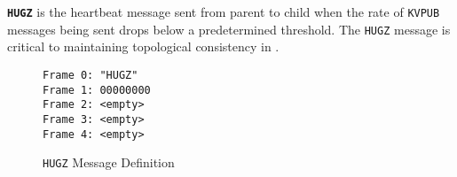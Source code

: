 \textbf{\texttt{HUGZ}} is the heartbeat message sent from parent to child when the rate of \texttt{KVPUB} messages being
sent drops below a predetermined threshold. The \texttt{HUGZ} message is critical to maintaining topological consistency
in \dcamp.

\begin{figure}[H]
\vspace{+10pt}
\begin{verbatim}
Frame 0: "HUGZ"
Frame 1: 00000000
Frame 2: <empty>
Frame 3: <empty>
Frame 4: <empty>
\end{verbatim}
\vspace{-20pt}
\caption{\texttt{HUGZ} Message Definition}
\label{fig:message_hugz}
\end{figure}
